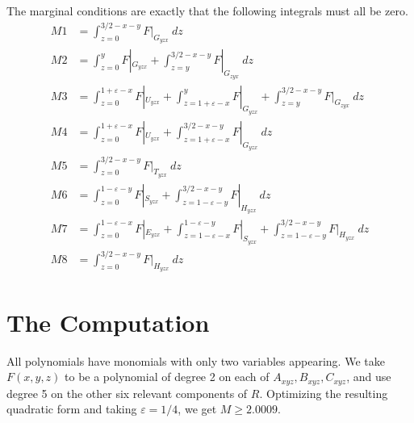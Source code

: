\documentclass[12pt]{amsart}
\numberwithin{equation}{section}
\theoremstyle{plain}
\theoremstyle{definition}
\begin{document}
The marginal conditions are exactly that the following integrals must all be zero.
\begin{align*}
M1 & =\int_{z=0}^{3/2-x-y}F|_{G_{yzx}}\ dz\\
M2 & =\int_{z=0}^{y}F|_{G_{yzx}} +\int_{z=y}^{3/2-x-y}F|_{G_{zyx}}\ dz\\
M3 & =\int_{z=0}^{1+\varepsilon-x}F|_{U_{yzx}} + \int_{z=1+\varepsilon-x}^{y}F|_{G_{yzx}} +\int_{z=y}^{3/2-x-y}F|_{G_{zyx}}\ dz\\
M4 & =\int_{z=0}^{1+\varepsilon-x}F|_{U_{yzx}} + \int_{z=1+\varepsilon-x}^{3/2-x-y}F|_{G_{yzx}}\ dz\\
M5 & =\int_{z=0}^{3/2-x-y}F|_{T_{yzx}}\ dz\\
M6 & =\int_{z=0}^{1-\varepsilon-y}F|_{S_{yzx}} +\int_{z=1-\varepsilon-y}^{3/2-x-y}F|_{H_{yzx}} \ dz\\
M7 & =\int_{z=0}^{1-\varepsilon-x}F|_{E_{yzx}} + \int_{z=1-\varepsilon-x}^{1-\varepsilon-y}F|_{S_{yzx}} + \int_{z=1-\varepsilon-y}^{3/2-x-y}F|_{H_{yzx}}\ dz\\
M8 & =\int_{z=0}^{3/2-x-y}F|_{H_{yzx}}\ dz
\end{align*}

\section{The Computation}

All polynomials have monomials with only two variables appearing.  We take $F(x,y,z)$ to be a polynomial of degree 2 on each of $A_{xyz},B_{xyz},C_{xyz}$, and use degree 5 on the other six relevant components of $R$.  Optimizing the resulting quadratic form and taking $\varepsilon=1/4$, we get $M\geq 2.0009$.
\end{document}
